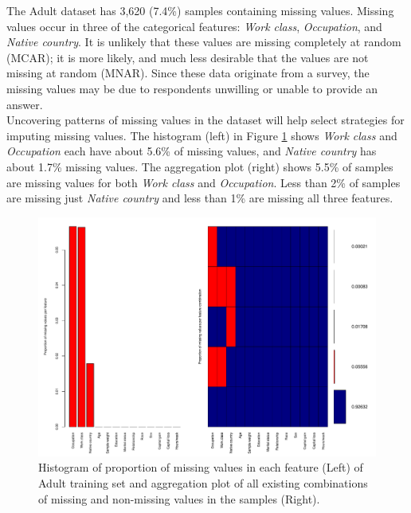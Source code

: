 \documentclass[12pt]{article}
\begin{document}
The Adult dataset has 3,620 (7.4\%) samples containing missing values. Missing values occur in three of the categorical features: \textit{Work class}, \textit{Occupation}, and \textit{Native country}. It is unlikely that these values are missing completely at random (MCAR); it is more likely, and much less desirable that the values are not missing at random (MNAR). Since these data originate from a survey, the missing values may be due to respondents unwilling or unable to provide an answer.  \\

Uncovering patterns of missing values in the dataset will help select strategies for imputing missing values. The histogram (left) in Figure \ref{proportion-missing} shows \textit{Work class} and \textit{Occupation} each have about 5.6\% of missing values, and \textit{Native country} has about 1.7\% missing values. The aggregation plot (right) shows 5.5\% of samples are missing values for both \textit{Work class} and \textit{Occupation}. Less than 2\% of samples are missing just \textit{Native country} and less than 1\% are missing all three features.

\begin{figure}[htbp] 
   \centering
   \includegraphics[scale=0.6]{proportion-missing.pdf} 
   \caption{Histogram of proportion of missing values in each feature (Left) of Adult training set and aggregation plot of all existing combinations of missing and non-missing values in the samples (Right).}
   \label{proportion-missing}
\end{figure}

\end{document}
